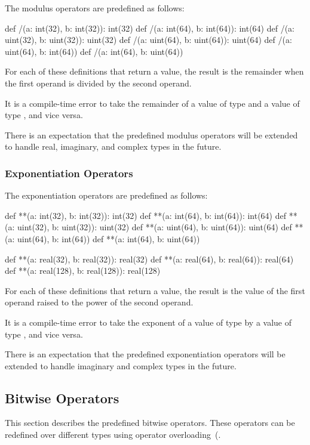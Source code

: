 The modulus operators are predefined as follows:
\begin{chapel}
def /(a: int(32), b: int(32)): int(32)
def /(a: int(64), b: int(64)): int(64)
def /(a: uint(32), b: uint(32)): uint(32)
def /(a: uint(64), b: uint(64)): uint(64)
def /(a: uint(64), b: int(64))
def /(a: int(64), b: uint(64))
\end{chapel}
For each of these definitions that return a value, the result is the
remainder when the first operand is divided by the second operand.

It is a compile-time error to take the remainder of a value of
type  and a value of type , and vice
versa.

There is an expectation that the predefined modulus operators will be
extended to handle real, imaginary, and complex types in the future.

\subsubsection{Exponentiation Operators}
\label{Exponentiation_Operators}

The exponentiation operators are predefined as follows:
\begin{chapel}
def **(a: int(32), b: int(32)): int(32)
def **(a: int(64), b: int(64)): int(64)
def **(a: uint(32), b: uint(32)): uint(32)
def **(a: uint(64), b: uint(64)): uint(64)
def **(a: uint(64), b: int(64))
def **(a: int(64), b: uint(64))

def **(a: real(32), b: real(32)): real(32)
def **(a: real(64), b: real(64)): real(64)
def **(a: real(128), b: real(128)): real(128)
\end{chapel}
For each of these definitions that return a value, the result is the
value of the first operand raised to the power of the second operand.

It is a compile-time error to take the exponent of a value of
type  by a value of type , and vice
versa.

There is an expectation that the predefined exponentiation operators
will be extended to handle imaginary and complex types in the future.

\subsection{Bitwise Operators}
\label{Bitwise_Operators}

This section describes the predefined bitwise operators.  These
operators can be redefined over different types using operator
overloading~(.


